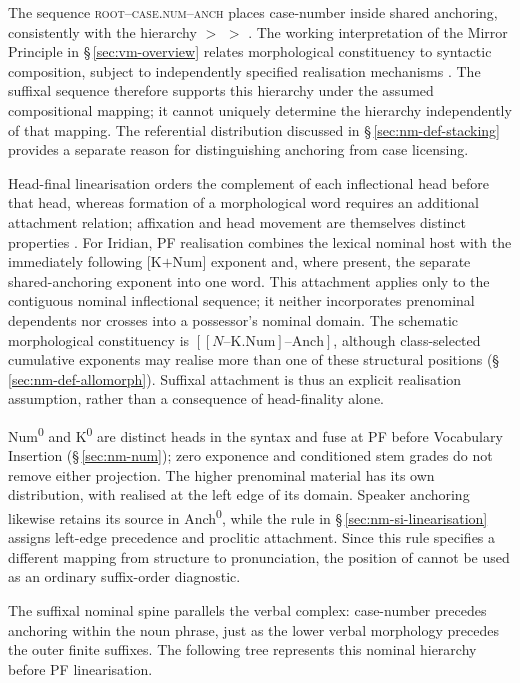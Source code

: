 The sequence \textsc{root--case.num--anch} places case-number inside
shared anchoring, consistently with the hierarchy  $>$
 $>$ . The working interpretation of the
Mirror Principle in §\,\ref{sec:vm-overview} relates morphological
constituency to syntactic composition, subject to independently specified
realisation mechanisms \cite{baker1985,harley2011}. The suffixal sequence
therefore supports this hierarchy under the assumed compositional mapping;
it cannot uniquely determine the hierarchy independently of that mapping.
The referential distribution discussed in §\,\ref{sec:nm-def-stacking}
provides a separate reason for distinguishing anchoring from case licensing.

Head-final linearisation orders the complement of each inflectional head
before that head, whereas formation of a morphological word requires an
additional attachment relation; affixation and head movement are themselves
distinct properties \cite{harley2013b}. For Iridian, PF realisation combines
the lexical nominal host with the immediately following [K$+$Num] exponent
and, where present, the separate shared-anchoring exponent into one word.
This attachment applies only to the contiguous nominal inflectional sequence;
it neither incorporates prenominal dependents nor crosses into a possessor's
nominal domain. The schematic morphological constituency is
$[[N\text{--}\mathrm{K.Num}]\text{--}\mathrm{Anch}]$, although class-selected
cumulative exponents may realise more than one of these structural positions
(§\,\ref{sec:nm-def-allomorph}). Suffixal attachment is thus an explicit
realisation assumption, rather than a consequence of head-finality alone.

Num\textsuperscript{0} and K\textsuperscript{0} are distinct heads in the
syntax and fuse at PF before Vocabulary Insertion (§\,\ref{sec:nm-num});
zero exponence and conditioned stem grades do not remove either projection.
The higher prenominal material has its own distribution, with
 realised at the left edge of its domain. Speaker anchoring
likewise retains its source in Anch\textsuperscript{0}, while the rule in
§\,\ref{sec:nm-si-linearisation} assigns  left-edge precedence and
proclitic attachment. Since this rule specifies a different mapping from
structure to pronunciation, the position of  cannot be used as an
ordinary suffix-order diagnostic.

The suffixal nominal spine parallels the verbal complex: case-number precedes
anchoring within the noun phrase, just as the lower verbal morphology precedes
the outer finite suffixes. The following tree represents this nominal hierarchy before PF linearisation.

